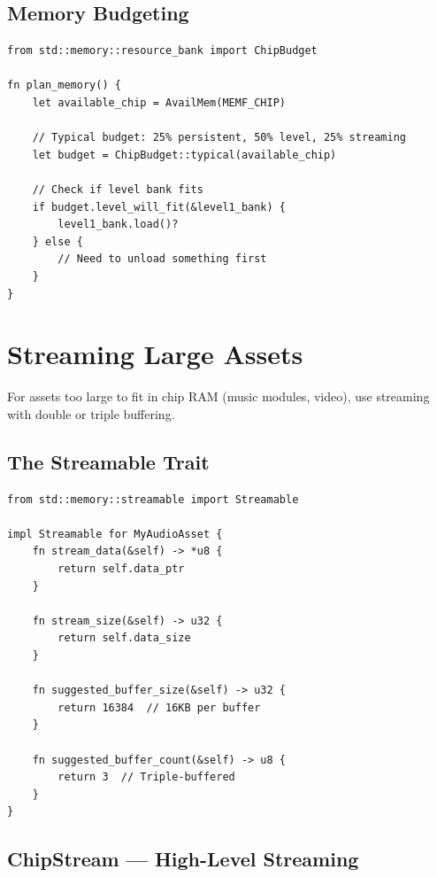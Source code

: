 \subsection{Memory Budgeting}

\begin{lstlisting}
from std::memory::resource_bank import ChipBudget

fn plan_memory() {
    let available_chip = AvailMem(MEMF_CHIP)

    // Typical budget: 25% persistent, 50% level, 25% streaming
    let budget = ChipBudget::typical(available_chip)

    // Check if level bank fits
    if budget.level_will_fit(&level1_bank) {
        level1_bank.load()?
    } else {
        // Need to unload something first
    }
}
\end{lstlisting}

\section{Streaming Large Assets}
\label{sec:streaming}

For assets too large to fit in chip RAM (music modules, video), use streaming with double or triple buffering.

\subsection{The Streamable Trait}

\begin{lstlisting}
from std::memory::streamable import Streamable

impl Streamable for MyAudioAsset {
    fn stream_data(&self) -> *u8 {
        return self.data_ptr
    }

    fn stream_size(&self) -> u32 {
        return self.data_size
    }

    fn suggested_buffer_size(&self) -> u32 {
        return 16384  // 16KB per buffer
    }

    fn suggested_buffer_count(&self) -> u8 {
        return 3  // Triple-buffered
    }
}
\end{lstlisting}

\subsection{ChipStream --- High-Level Streaming}


